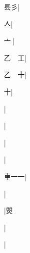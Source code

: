 \begin{multicols}{2}
{{\cjk{}{\cnsym{}　}镸彡}|{}\par
{亼}|{}\par
{\cjk{}{\cnsym{}　}亠{\cnjzr{}}}|{}\par
{\cjk{}乙{\cnsym{}　}工}|{}\par
{\cjk{}乙{\cnsym{}　}十}|{}\par
{\cjk{}{\cnsym{}　}{\cnsym{}　}十}|{}\par
{\cjk{}{\cnsym{}　}{\cnsym{}　}{\cnsym{}　}}|{}\par
{}|{}\par
{}|{}\par
{}|{}\par
{\cjk{}車一一}|{}\par
{}|{}\par
{\cjk{}{\cnsym{}　}{\cnsym{}　}{\cnsym{}　}}|{\cjk{}焸}\par
{\cjk{}{\cnsym{}　}{\cnsym{}　}{\cnsym{}　}}|{}\par
{}|{}\par
}
\end{multicols}
